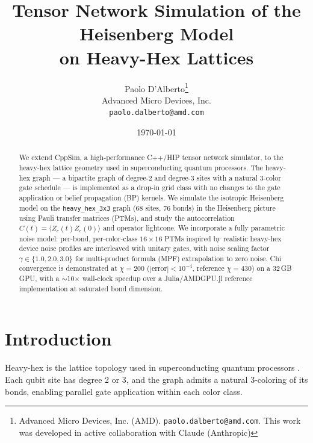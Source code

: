 \documentclass[12pt]{article}
\begin{document}
\title{Tensor Network Simulation of the Heisenberg Model\\
       on Heavy-Hex Lattices}

\author{
 Paolo D'Alberto\thanks{Advanced Micro Devices, Inc. (AMD).
 \texttt{paolo.dalberto@amd.com}.
 This work was developed in active collaboration with Claude
 (Anthropic)}\\
 \small Advanced Micro Devices, Inc.\\
 \small\texttt{paolo.dalberto@amd.com}
}


\date{\today}

\maketitle

\begin{abstract}
We extend CppSim, a high-performance C++/HIP tensor network simulator,
to the heavy-hex lattice geometry used in superconducting quantum processors.
The heavy-hex graph — a bipartite graph of degree-2 and degree-3 sites with
a natural 3-color gate schedule — is implemented as a drop-in grid class
with no changes to the gate application or belief propagation (BP) kernels.
We simulate the isotropic Heisenberg model on the \texttt{heavy\_hex\_3x3}
graph (68 sites, 76 bonds) in the Heisenberg picture using Pauli transfer
matrices (PTMs), and study the autocorrelation $C(t) = \langle Z_c(t)Z_c(0)\rangle$
and operator lightcone.
We incorporate a fully parametric noise model: per-bond, per-color-class
$16\times 16$ PTMs inspired by realistic heavy-hex device noise profiles are
interleaved with unitary gates, with noise scaling factor $\gamma \in \{1.0, 2.0, 3.0\}$
for multi-product formula (MPF) extrapolation to zero noise.
Chi convergence is demonstrated at $\chi=200$ ($|\mathrm{error}|<10^{-4}$,
reference $\chi=430$) on a 32\,GB GPU, with a $\sim$10$\times$ wall-clock
speedup over a Julia/AMDGPU.jl reference implementation at saturated bond dimension.
\end{abstract}

\section{Introduction}
\label{sec:intro}

Heavy-hex is the lattice topology used in superconducting quantum processors
\cite{heavyhex-topology}. Each qubit site has degree 2 or 3, and the graph admits
a natural 3-coloring of its bonds, enabling parallel gate application within
each color class.
\end{document}
